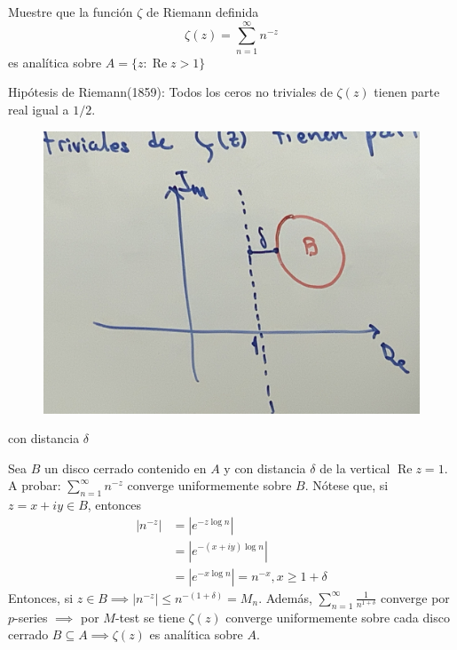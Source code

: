 \begin{ejemplo}
    Muestre que la función $\zeta$ de Riemann definida 
    $$\zeta(z)=\sum_{n=1}^{\infty}n^{-z}$$
    es analítica sobre $A=\{z:\operatorname{Re} z>1\}$
    \begin{cajita}
        Hipótesis de Riemann(1859): Todos los ceros no triviales de $\zeta(z)$ tienen parte real igual a $1/2$.
    \end{cajita}
    \begin{figure}[H]
        \centering
        \includegraphics[scale=0.1]{imagenes/19.2.jpeg}
    \end{figure}  con distancia $\delta$
    \begin{sol}
        Sea $B$ un disco cerrado contenido en $A$ y con distancia $\delta$ de la vertical $\operatorname{Re}z=1$. A probar: $\sum_{n=1}^{\infty} n^{-z}$ converge uniformemente sobre $B$. 
        Nótese que, si $z=x+iy\in B$, entonces
        \begin{align*}
            |n^{-z}| &= |e^{-z\log n}|\\
                    &= |e^{-(x+iy)\log n}|\\
                    &=| e^{-x\log n}|= n^{-x}, x\geq 1+\delta
        \end{align*}
        Entonces, si $z\in B\implies |n^{-z}|\leq n^{-(1+\delta)}=M_n$. 
        Además, $\sum_{n=1}^{\infty}\frac{1}{n^{1+\delta}}$ converge por $p$-series $\implies$ por $M$-test se tiene $\zeta(z)$ converge uniformemente sobre cada disco cerrado $B\subseteq A\implies \zeta(z)$ es analítica sobre $A$. 
    \end{sol}
\end{ejemplo}

